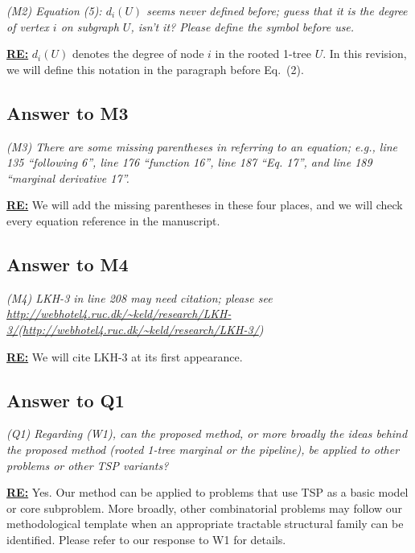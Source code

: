 \textit{(M2) Equation (5): $d_i(U)$ seems never defined before; guess that it is the degree of vertex $i$ on subgraph $U$, isn't it? Please define the symbol before use.}

\textbf{\underline{RE:}}
\(d_i(U)\) denotes the degree of node \(i\) in the rooted 1-tree \(U\). In this revision, we will define this notation in the paragraph before Eq.~(2).

\subsection{Answer to M3}

\textit{(M3) There are some missing parentheses in referring to an equation; e.g., line 135 ``following 6'', line 176 ``function 16'', line 187 ``Eq. 17'', and line 189 ``marginal derivative 17''.}

\textbf{\underline{RE:}}
We will add the missing parentheses in these four places, and we will check every equation reference in the manuscript.

\subsection{Answer to M4}

\textit{(M4) LKH-3 in line 208 may need citation; please see \url{http://webhotel4.ruc.dk/~keld/research/LKH-3/}(\url{http://webhotel4.ruc.dk/~keld/research/LKH-3/})}

\textbf{\underline{RE:}}
We will cite LKH-3 at its first appearance.


\subsection{Answer to Q1}

\textit{(Q1) Regarding (W1), can the proposed method, or more broadly the ideas behind the proposed method (rooted 1-tree marginal or the pipeline), be applied to other problems or other TSP variants?}


\textbf{\underline{RE:}}
Yes. Our method can be applied to problems that use TSP as a basic model or core subproblem. More broadly, other combinatorial problems may follow our methodological template when an appropriate tractable structural family can be identified. Please refer to our response to W1 for details.

